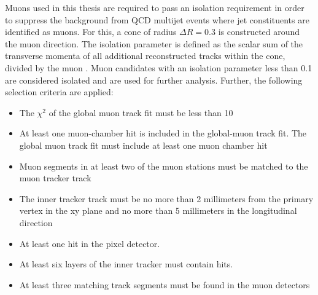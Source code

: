 Muons used in this thesis are required to pass an isolation requirement in order to suppress the background from QCD multijet events where jet constituents are identified as muons. For this, a cone of radius $\Delta R = 0.3$ is constructed around the muon direction. The isolation parameter is defined as the scalar sum of the transverse momenta of all additional reconstructed tracks within the cone, divided by the muon \PT{}. Muon candidates with an isolation parameter less
than 0.1 are considered isolated and are used for further analysis. \newline
Further, the following selection criteria are applied:
\begin{itemize}
  \itemsep0em 
  \item The $\chi^2$ of the global muon track fit must be less than 10
  \item At least one muon-chamber hit is included in the global-muon track fit. The global muon track fit must include at least one muon chamber hit
  \item Muon segments in at least two of the muon stations must be matched to the muon tracker track  
  \item The inner tracker track must be no more than 2 millimeters from the primary vertex in the xy plane and no more than 5 millimeters in the longitudinal direction
 \item At least one hit in the pixel detector.
 \item At least six layers of the inner tracker must contain hits.
 \item At least three matching track segments must be found in the
muon detectors
\end{itemize}



